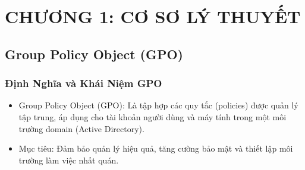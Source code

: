 \documentclass[13pt]{article}
\begin{document}
	\newpage
	\tableofcontents
	\newpage
	\setcounter{page}{1}
	\section{CHƯƠNG 1: CƠ SƠ LÝ THUYẾT }
            \subsection{Group Policy Object (GPO)}
                \subsubsection{Định Nghĩa và Khái Niệm GPO}
                \begin{itemize}
                \item Group Policy Object (GPO): Là tập hợp các quy tắc (policies) được quản lý tập trung, áp dụng cho tài khoản người dùng và máy tính trong một môi trường domain (Active Directory).

                \item Mục tiêu: Đảm bảo quản lý hiệu quả, tăng cường bảo mật và thiết lập môi trường làm việc nhất quán.
                \end{itemize}
\end{document}
